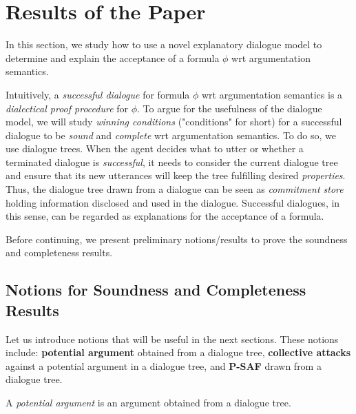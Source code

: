 

\section{Results of the Paper}
In this section, we study how to use a novel explanatory dialogue model to determine and explain the acceptance of a formula $\phi$ wrt argumentation semantics.

Intuitively, a \textit{successful dialogue} for formula $\phi$ wrt argumentation semantics is a \textit{dialectical proof procedure} for $\phi$. To argue for the usefulness of the dialogue model, we will study \emph{winning conditions} ("conditions" for short) for a successful dialogue to be \textit{sound} and \textit{complete} wrt argumentation semantics. To do so, we use dialogue trees. When the agent decides what to utter or whether a terminated dialogue is \emph{successful}, it needs to consider the current dialogue tree and ensure that its new utterances will keep the tree fulfilling desired \textit{properties}. 
Thus, the dialogue tree drawn from a dialogue can be seen as \emph{commitment store}~\cite{prakken_2006} holding information disclosed and used in the dialogue. Successful dialogues, in this sense, can be regarded as explanations for the acceptance of a formula.

Before continuing, we present preliminary notions/results to prove the soundness and completeness results.

\subsection{Notions for Soundness and Completeness Results}
Let us introduce notions that will be useful in the next sections. 
These notions include: \textbf{potential argument} obtained from a dialogue tree, \textbf{collective attacks} against a potential argument in a dialogue tree, and \textbf{P-SAF} drawn from a dialogue tree. %

A \emph{potential argument} is an argument obtained from a dialogue tree.


